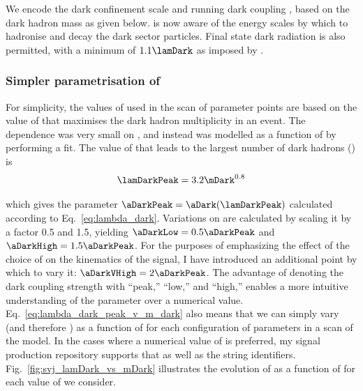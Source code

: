 We encode the dark confinement scale \lamDark and running dark coupling \aDark, based on the dark hadron mass as given below. \PYTHIA is now aware of the energy scales by which to hadronise and decay the dark sector particles. Final state dark radiation is also permitted, with a minimum \pt of $\text{1.1}\lamDark$ as imposed by \PYTHIA.




\subsubsection{Simpler parametrisation of \texorpdfstring{\aDark}{alpha\_dark}}
\label{subsubsec:svj_effective_alpha_dark}

For simplicity, the values of \aDark used in the scan of parameter points are based on the value of \lamDark that maximises the dark hadron multiplicity in an event. The dependence was very small on \mZprime, and instead was modelled as a function of \mDark by performing a fit. The value of \lamDark that leads to the largest number of dark hadrons (\lamDarkPeak) is
\begin{equation}
    \lamDarkPeak = 3.2 \mDark^{0.8}
    \label{eq:lambda_dark_peak_v_m_dark}
\end{equation}

which gives the parameter $\aDarkPeak = \aDark(\lamDarkPeak)$ calculated according to Eq.~\ref{eq:lambda_dark}. Variations on \aDark are calculated by scaling it by a factor 0.5 and 1.5, yielding $\aDarkLow = \text{0.5}\aDarkPeak$ and $\aDarkHigh = \text{1.5}\aDarkPeak$. For the purposes of emphasizing the effect of the choice of \aDark on the kinematics of the signal, I have introduced an additional point by which to vary it: $\aDarkVHigh = \text{2}\aDarkPeak$. The advantage of denoting the dark coupling strength with ``peak,'' ``low,'' and ``high,'' enables a more intuitive understanding of the parameter over a numerical value. Eq.~\ref{eq:lambda_dark_peak_v_m_dark} also means that we can simply vary \lamDark (and therefore \aDark) as a function of \mDark for each configuration of parameters in a scan of the model. In the cases where a numerical value of \aDark is preferred, my signal production repository supports that as well as the string identifiers. Fig.~\ref{fig:svj_lamDark_vs_mDark} illustrates the evolution of \lamDark as a function of \mDark for each value of \aDark we consider.

